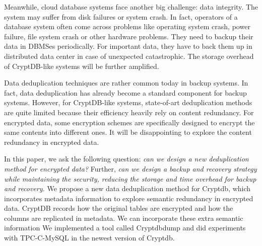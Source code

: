 Meanwhile, cloud database systems face another big challenge: data integrity. The system may suffer from disk failures or system crash. In fact, operators of a database system often come across problems like operating system crash, power failure, file system crash or other hardware problems\citep{mysqlbackupdocumentation}. They need to backup their data in DBMSes periodically. For important data, they have to back them up in distributed data center in case of unexpected catastrophic. The storage overhead of CryptDB-like systems will be further amplified. 



Data deduplication techniques are rather common today in backup systems. In fact, data deduplication has already become a standard component for backup systems\citep{fu2015design}. However, for CryptDB-like systems, state-of-art deduplication methods are quite limited because their efficiency heavily rely on content redundancy. For encrypted data, some encryption schemes are specifically designed to encrypt the same contents into different ones. It will be disappointing to explore the content redundancy in encrypted data. 



In this paper, we ask the following question: \textit{can we design a new deduplication method for encrypted data?} Further, \textit{can we design a backup and recovery strategy while maintaining the security, reducing the storage and time overhead for backup and recovery.} We propose a new data deduplication method for Cryptdb, which incorporates metadata information to explore semantic redundancy in encrypted data. CryptDB records how the original tables are encrypted and how the columns are replicated in metadata. We can incorporate these extra semantic information We implemented a tool called Cryptdbdump and did experiments with TPC-C-MySQL in the newest version of Cryptdb.



